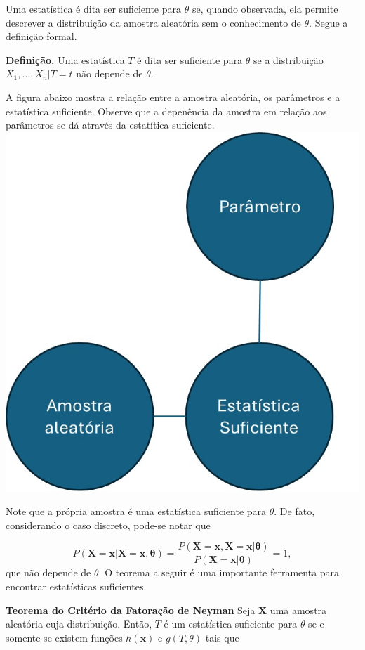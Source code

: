 \documentclass[
  letterpaper,
  DIV=11,
  numbers=noendperiod]{scrartcl}
\begin{document}
Uma estatística é dita ser suficiente para \(\theta\) se, quando
observada, ela permite descrever a distribuição da amostra aleatória sem
o conhecimento de \(\theta\). Segue a definição formal.

\textbf{Definição.} Uma estatística \(T\) é dita ser suficiente para
\(\theta\) se a distribuição \(X_1,\ldots,X_n|T=t\) não depende de
\(\theta\).

A figura abaixo mostra a relação entre a amostra aleatória, os
parâmetros e a estatística suficiente. Observe que a depenência da
amostra em relação aos parâmetros se dá através da estatítica
suficiente. \includegraphics{fig_stat_suficiente.jpg}

Note que a própria amostra é uma estatística suficiente para \(\theta\).
De fato, considerando o caso discreto, pode-se notar que

\[P(\textbf{X}=\textbf{x}|\textbf{X}=\textbf{x},\boldsymbol{\theta})=\frac{P(\textbf{X}=\textbf{x},\textbf{X}=\textbf{x}|\boldsymbol{\theta})}{P(\textbf{X}=\textbf{x}|\boldsymbol{\theta})}=1,\]
que não depende de \(\theta\). O teorema a seguir é uma importante
ferramenta para encontrar estatísticas suficientes.

\textbf{Teorema do Critério da Fatoração de Neyman} Seja \(\textbf{X}\)
uma amostra aleatória cuja distribuição. Então, \(T\) é um estatística
suficiente para \(\theta\) se e somente se existem funções
\(h(\textbf{x})\) e \(g(T,\theta)\) tais que
\end{document}
